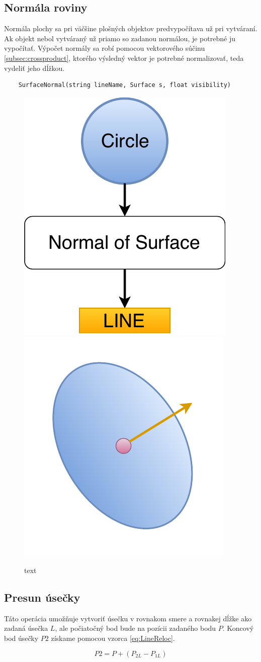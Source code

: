 \subsection{Normála roviny}
Normála plochy sa pri väčšine plošných objektov predvypočítava už pri vytváraní. Ak objekt nebol vytváraný už priamo so zadanou normálou, je potrebné ju vypočítať. Výpočet normály sa robí pomocou vektorového súčinu \ref{subsec:crossproduct}, ktorého výsledný vektor je potrebné normalizovať, teda vydeliť jeho dĺžkou.


\begin{lstlisting}
	SurfaceNormal(string lineName, Surface s, float visibility)
\end{lstlisting}


\begin{figure}[H]
	\centering
	\includegraphics[height=0.3\textwidth]{obrazky-figures/Diagram/Line/DP Navrh operacii-1D - LineSurfaceNormal.pdf}
	\includegraphics[height=0.3\textwidth]{obrazky-figures/Diagram/Draw/2Line/DP Navrh operacii-1D - LineSurfaceNormal.pdf}
	\caption{text}
	\label{fig:1}
\end{figure}



\subsection{Presun úsečky}
Táto operácia umožňuje vytvoriť úsečku v rovnakom smere a rovnakej dĺžke ako zadaná úsečka $L$, ale počiatočný bod bude na pozícii zadaného bodu $P$. 
Koncový bod úsečky $P2$ získame pomocou vzorca \ref{eq:LineReloc}. 

\begin{equation}
    P2 = P + (P_{2L}-P_{1L})
    \label{eq:LineReloc}
\end{equation}



